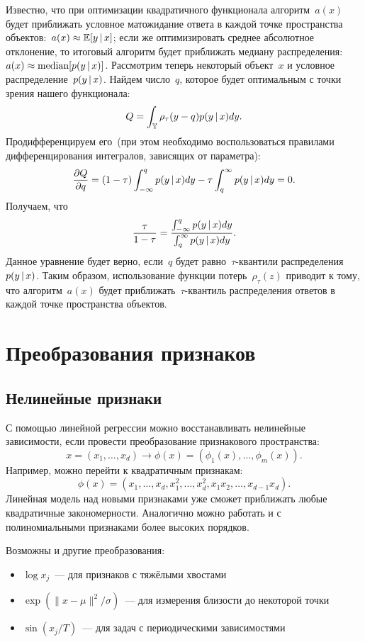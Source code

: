 \documentclass[12pt,fleqn]{article}
\begin{document}
Известно, что при оптимизации квадратичного функционала алгоритм~$a(x)$
будет приближать условное матожидание ответа в каждой точке пространства
объектов:~$a(x) \approx \mathbb{E} [y \mspace{3mu}{|}\mspace{3mu} x]$;
если же оптимизировать среднее абсолютное отклонение, то итоговый алгоритм
будет приближать медиану распределения:~$a(x) \approx \text{median} [p(y \mspace{3mu}{|}\mspace{3mu} x)]$.
Рассмотрим теперь некоторый объект~$x$ и условное распределение~$p(y \mspace{3mu}{|}\mspace{3mu} x)$.
Найдем  число~$q$, которое будет оптимальным с точки зрения нашего функционала:
\[
    Q = \int_{\mathbb{Y}} \rho_\tau(y - q) p(y \mspace{3mu}{|}\mspace{3mu} x) dy.
\]
Продифференцируем его~(при этом необходимо воспользоваться правилами
дифференцирования интегралов, зависящих от параметра):
\[
    \frac{\partial Q}{\partial q}
    =
    (1 - \tau) \int_{-\infty}^{q} p(y \mspace{3mu}{|}\mspace{3mu} x) dy
    -
    \tau \int_{q}^{\infty} p(y \mspace{3mu}{|}\mspace{3mu} x) dy
    =
    0.
\]
Получаем, что
\[
    \frac{\tau}{1 - \tau}
    =
    \frac{
        \int_{-\infty}^{q} p(y \mspace{3mu}{|}\mspace{3mu} x) dy
    }{
        \int_{q}^{\infty} p(y \mspace{3mu}{|}\mspace{3mu} x) dy
    }.
\]
Данное уравнение будет верно, если~$q$ будет равно~$\tau$-квантили распределения~$p(y \mspace{3mu}{|}\mspace{3mu} x)$.
Таким образом, использование функции потерь~$\rho_\tau(z)$ приводит к тому,
что алгоритм~$a(x)$ будет приближать~$\tau$-квантиль распределения ответов в каждой точке
пространства объектов.

\section{Преобразования признаков}

\subsection{Нелинейные признаки}

С помощью линейной регрессии можно восстанавливать нелинейные зависимости,
если провести преобразование признакового пространства:
\[
    x = (x_1, \dots, x_d) \to \phi(x) = (\phi_1(x), \dots, \phi_m(x)).
\]
Например, можно перейти к квадратичным признакам:
\[
    \phi(x)
    =
    (x_1, \dots, x_d, x_1^2, \dots, x_d^2, x_1 x_2, \dots, x_{d-1} x_d).
\]
Линейная модель над новыми признаками уже сможет приближать любые квадратичные закономерности.
Аналогично можно работать и с полиномиальными признаками более высоких порядков.

Возможны и другие преобразования:
\begin{itemize}
    \item $\log x_j$~--- для признаков с тяжёлыми хвостами
    \item $\exp(\|x - \mu\|^2 / \sigma)$~--- для измерения близости до некоторой точки
    \item $\sin(x_j / T)$~--- для задач с периодическими зависимостями
\end{itemize}
\end{document}
